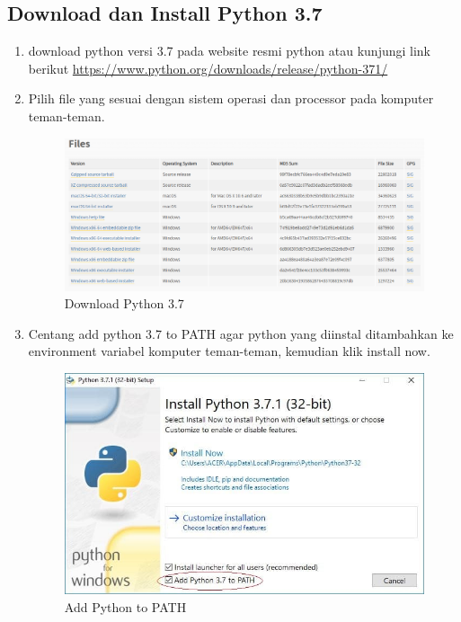 \subsection{Download dan Install Python 3.7}
\begin{enumerate}
\item download python versi 3.7 pada website resmi python atau kunjungi link berikut \url{https://www.python.org/downloads/release/python-371/}

\item Pilih file yang sesuai dengan sistem operasi dan processor pada komputer teman-teman.
\begin{figure}[H]
\centering
\includegraphics[scale=.35]{figures/python1}
\caption{Download Python 3.7}
\label{python1}
\end{figure}

\item Centang add python 3.7 to PATH agar python yang diinstal ditambahkan ke environment variabel komputer teman-teman, kemudian klik install now.
\begin{figure}[H]
\centering
\includegraphics[scale=.4]{figures/python2}
\caption{Add Python to PATH}
\label{python2}
\end{figure}


\end{enumerate}
